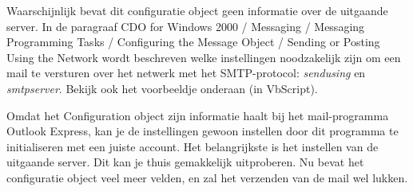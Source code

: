 \documentclass[11pt,a4paper]{report}
\begin{document}
\newpage
Waarschijnlijk bevat dit configuratie object geen informatie over de uitgaande server. In de paragraaf CDO for Windows 2000 / Messaging / Messaging Programming Tasks / Configuring the Message Object / Sending or Posting Using the Network wordt beschreven welke instellingen noodzakelijk zijn om een mail te versturen over het netwerk met het SMTP-protocol: \textit{sendusing} en \textit{smtpserver}. Bekijk ook het voorbeeldje onderaan (in VbScript).
\par Omdat het Configuration object zijn informatie haalt bij het mail-programma Outlook Express, kan je de instellingen gewoon instellen door dit programma te initialiseren met een juiste account. Het belangrijkste is het instellen van de uitgaande server.
Dit kan je thuis gemakkelijk uitproberen. Nu bevat het configuratie object veel meer velden, en zal het verzenden van de mail wel lukken.
\end{document}
